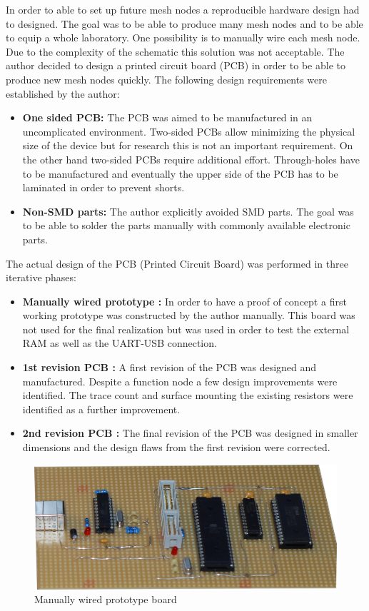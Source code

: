 In order to able to set up future mesh nodes a reproducible hardware design had to designed. The goal was to be able to produce many mesh nodes and to be able to equip a whole laboratory. One possibility is to manually wire each mesh node. Due to the complexity of the schematic this solution was not acceptable. The author decided to design a printed circuit board (PCB) in order to be able to produce new mesh nodes quickly. The following design requirements were established by the author:

\begin{itemize}
    \item \textbf{One sided PCB: } The PCB was aimed to be manufactured in an uncomplicated environment. Two-sided PCBs allow minimizing the physical size of the device but for research this is not an important requirement. On the other hand two-sided PCBs require additional effort. Through-holes have to be manufactured and eventually the upper side of the PCB has to be laminated in order to prevent shorts.
    \item \textbf{Non-SMD parts: } The author explicitly avoided SMD parts. The goal was to be able to solder the parts manually with commonly available electronic parts.
\end{itemize}

The actual design of the PCB (Printed Circuit Board) was performed in three iterative phases:
\begin{itemize}
    \item \textbf{Manually wired prototype :} In order to have a proof of concept a first working prototype was constructed by the author manually. This board was not used for the final realization but was used in order to test the external RAM as well as the UART-USB connection.
    \item \textbf{1st revision PCB :} A first revision of the PCB was designed and manufactured. Despite a function node a few design improvements were identified. The trace count and surface mounting the existing resistors were identified as a further improvement.
    \item \textbf{2nd revision PCB :} The final revision of the PCB was designed in smaller dimensions and the design flaws from the first revision were corrected.
\end{itemize}

\begin{figure}[H]
\includegraphics[width=\textwidth]{figures/prototype_pcb.jpg}
\caption{Manually wired prototype board}
\end{figure}

